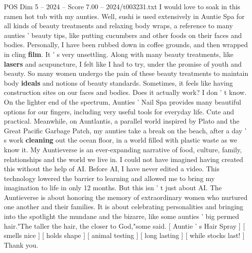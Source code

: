 \begin{textsample}{POS Dim 5 – 2024 – Score 7.00 – 2024/t003231.txt}
I would love to soak in this ramen hot tub with my aunties.
Well, sushi is used extensively in Auntie Spa for all kinds of beauty treatments and relaxing body wraps, a reference to many aunties ' beauty tips, like putting cucumbers and other foods on their faces and bodies.
Personally, I have been rubbed down in coffee grounds, and then wrapped in cling \textbf{film}.
It ' s very unsettling.
Along with many beauty treatments, like \textbf{lasers} and acupuncture, I felt like I had to try, under the promise of youth and beauty.
So many women undergo the pain of these beauty treatments to maintain body \textbf{ideals} and notions of beauty standards.
Sometimes, it feels like having construction sites on our faces and bodies.
Does it actually work?
I don ' t know.
On the lighter end of the spectrum, Aunties ' Nail Spa provides many beautiful options for our fingers, including very useful tools for everyday life.
Cute and practical.
Meanwhile, on Auntlantis, a parallel world inspired by Plato and the Great Pacific Garbage Patch, my aunties take a break on the beach, after a day ' s work \textbf{cleaning} out the ocean floor, in a world filled with plastic waste as we know it.
My Auntieverse is an ever-expanding narrative of food, culture, family, relationships and the world we live in.
I could not have imagined having created this without the help of AI.
Before AI, I have never edited a video.
This technology lowered the barrier to learning and allowed me to bring my imagination to life in only 12 months.
But this isn ' t just about AI.
The Auntieverse is about honoring the memory of extraordinary women who nurtured one another and their families.
It is about celebrating personalities and bringing into the spotlight the mundane and the bizarre, like some aunties ' big permed hair."The taller the hair, the closer to God,"some said. [ Auntie ' s Hair Spray ] [ smells nice ] [ holds shape ] [ animal testing ] [ long lasting ] [ while stocks last! ] Thank you.

\end{textsample}
